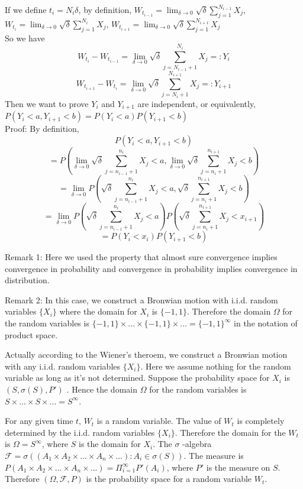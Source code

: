 If we define $t_{i}=N_{i}\delta$, by definition, $W_{t_{i-1}}=\lim_{\delta\rightarrow0}\sqrt{\delta}\sum\limits_{j=1}^{N_{i-1}}X_j$, $W_{t_{i}}=\lim_{\delta\rightarrow0}\sqrt{\delta}\sum\limits_{j=1}^{N_i}X_j$, $W_{t_{i+1}}=\lim_{\delta\rightarrow0}\sqrt{\delta}\sum\limits_{j=1}^{N_{i+1}}X_j$
~\\So we have $$W_{t_{i}}-W_{t_{i-1}}=\lim_{\delta\rightarrow0}\sqrt{\delta}\sum\limits_{j=N_{i-1}+1}^{N_{i}}X_j=:Y_i$$
$$W_{t_{i+1}}-W_{t_{i}}=\lim_{\delta\rightarrow0}\sqrt{\delta}\sum\limits_{j=N_{i}+1}^{N_{i+1}}X_j=:Y_{i+1}$$
Then we want to prove $Y_{i}$ and $Y_{i+1}$ are independent, or equivalently, $P(Y_i<a, Y_{i+1}<b)=P(Y_i<a)P(Y_{i+1}<b)$
~\\Proof: By definition, $$P(Y_i<a, Y_{i+1}<b)$$
$$=P(\lim_{\delta\rightarrow0}\sqrt{\delta}\sum\limits_{j=n_{i-1}+1}^{n_{i}}X_j<a, \lim_{\delta\rightarrow0}\sqrt{\delta}\sum\limits_{j=n_{i}+1}^{n_{i+1}}X_j<b)$$
$$=\lim_{\delta\rightarrow0}P(\sqrt{\delta}\sum\limits_{j=n_{i-1}+1}^{n_{i}}X_j<a, \sqrt{\delta}\sum\limits_{j=n_{i}+1}^{n_{i+1}}X_j<b)$$
$$=\lim_{\delta\rightarrow0}P(\sqrt{\delta}\sum\limits_{j=n_{i-1}+1}^{n_{i}}X_j<a)P(\sqrt{\delta}\sum\limits_{j=n_{i}+1}^{n_{i+1}}X_j<x_{i+1})$$
$$=P(Y_i<x_i)P(Y_{i+1}<b)$$

Remark 1: Here we used the property that almost sure convergence implies convergence in probability and convergence in probability implies convergence in distribution.

Remark 2:
In this case, we construct a Bronwian motion with i.i.d. random variables $\{X_i\}$ where the domain for $X_i$ is  $\{-1,1\}$. Therefore the domain $\Omega$ for the random variables is $\{-1,1\}\times...\times\{-1,1\}\times...=\{-1,1\}^{\infty}$ in the notation of product space.

Actually according to the Wiener's theroem, we construct a Bronwian motion with any i.i.d. random variables $\{X_i\}$. Here we assume nothing for the random variable as long as it's not determined. Suppose the probability space  for $X_i$ is  $(S, \sigma(S),P')$ . Hence the domain $\Omega$ for the random variables is $S\times...\times S\times...=S^{\infty}$.

For any given time $t$, $W_t$ is a random variable. The value of $W_t$ is completely determined by the i.i.d. random variables $\{X_i\}$. Therefore the domain  for the $W_t$ is $\Omega=S^{\infty}$, where $S$ is the domain for $X_i$. The $\sigma$ -algebra   $\mathcal{F}=\sigma((A_1\times A_2\times ...\times A_n \times...):A_i\in \sigma(S))$. The measure  is $P(A_1\times A_2\times ...\times A_n \times...)=\Pi_{i=1}^{\infty}P'(A_i)$, where $P'$ is the measure on $S$. Therefore $(\Omega, \mathcal{F},P)$ is the probability space for a random variable $W_t$.


